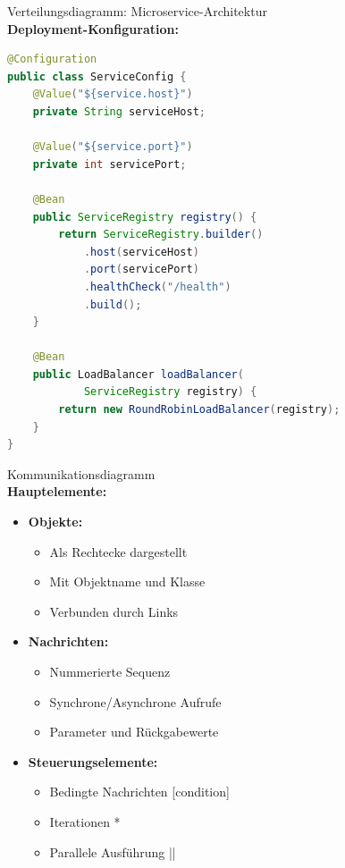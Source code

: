 \begin{example2}{Verteilungsdiagramm: Microservice-Architektur}\\
\textbf{Deployment-Konfiguration:}

\begin{lstlisting}[language=Java, style=basesmol]
@Configuration
public class ServiceConfig {
    @Value("${service.host}")
    private String serviceHost;
    
    @Value("${service.port}")
    private int servicePort;
    
    @Bean
    public ServiceRegistry registry() {
        return ServiceRegistry.builder()
            .host(serviceHost)
            .port(servicePort)
            .healthCheck("/health")
            .build();
    }
    
    @Bean
    public LoadBalancer loadBalancer(
            ServiceRegistry registry) {
        return new RoundRobinLoadBalancer(registry);
    }
}
\end{lstlisting}
\end{example2}

\begin{definition}{Kommunikationsdiagramm}\\
\textbf{Hauptelemente:}
\begin{itemize}
    \item \textbf{Objekte:}
    \begin{itemize}
        \item Als Rechtecke dargestellt
        \item Mit Objektname und Klasse
        \item Verbunden durch Links
    \end{itemize}
    
    \item \textbf{Nachrichten:}
    \begin{itemize}
        \item Nummerierte Sequenz
        \item Synchrone/Asynchrone Aufrufe
        \item Parameter und Rückgabewerte
    \end{itemize}
    
    \item \textbf{Steuerungselemente:}
    \begin{itemize}
        \item Bedingte Nachrichten [condition]
        \item Iterationen *
        \item Parallele Ausführung || 
    \end{itemize}
\end{itemize}
\end{definition}

